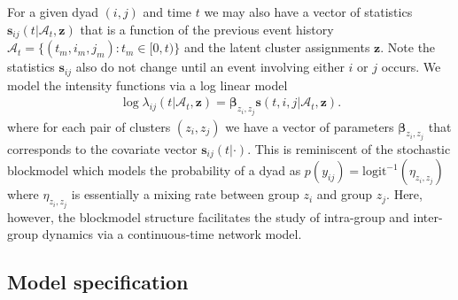 \documentclass[11pt]{article}
\begin{document}
For a given dyad $(i,j)$ and time $t$ we may also have a vector of statistics $\mathbf{s}_{ij}(t|\mathcal{A}_t,\mathbf{z})$ that is a function of the previous event history  $\mathcal{A}_t = \{(t_m,i_m,j_m): t_m \in [0,t)\}$  and the latent cluster assignments $\mathbf{z}$.  Note the statistics $\mathbf{s}_{ij}$ also do not change until an event involving either $i$ or $j$ occurs.  We model the intensity functions via a log linear model
\begin{align}
\log \lambda_{ij}(t | \mathcal{A}_t,\mathbf{z}) = \boldsymbol{\beta}_{z_i,z_j} \mathbf{s}(t,i,j|\mathcal{A}_t,\mathbf{z}).
\end{align}
where for each pair of clusters $(z_i,z_j)$ we have a vector of parameters $\boldsymbol{\beta}_{z_i,z_j}$ that corresponds to the covariate vector $\mathbf{s}_{ij}(t|\cdot)$.  This is reminiscent of the stochastic blockmodel \cite{Nowicki2001,Kemp} which models the probability of a dyad as $p(y_{ij}) =\mbox{logit}^{-1}( \eta_{z_i,z_j})$ where $\eta_{z_i,z_j}$ is essentially a mixing rate between group $z_i$ and group $z_j$.  Here, however, the blockmodel structure facilitates the study of intra-group and inter-group dynamics via a continuous-time network model.

\subsection{Model specification}
\end{document}
